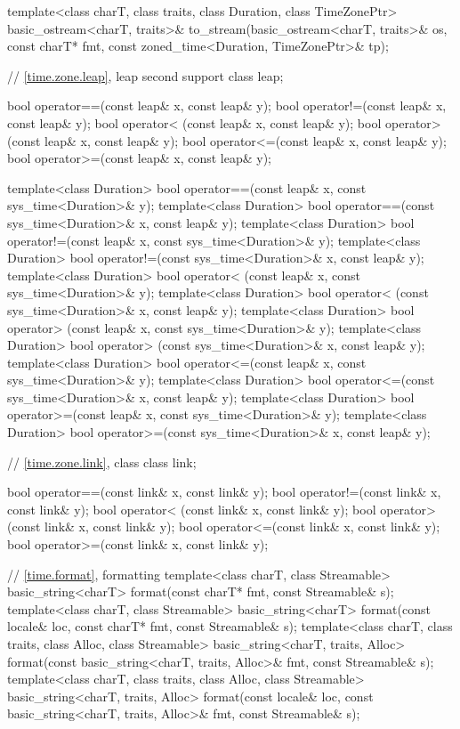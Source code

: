 \begin{codeblock}
{{    template<class charT, class traits, class Duration, class TimeZonePtr>
      basic_ostream<charT, traits>&
        to_stream(basic_ostream<charT, traits>& os, const charT* fmt,
                  const zoned_time<Duration, TimeZonePtr>& tp);

    // \ref{time.zone.leap}, leap second support
    class leap;

    bool operator==(const leap& x, const leap& y);
    bool operator!=(const leap& x, const leap& y);
    bool operator< (const leap& x, const leap& y);
    bool operator> (const leap& x, const leap& y);
    bool operator<=(const leap& x, const leap& y);
    bool operator>=(const leap& x, const leap& y);

    template<class Duration>
      bool operator==(const leap& x, const sys_time<Duration>& y);
    template<class Duration>
      bool operator==(const sys_time<Duration>& x, const leap& y);
    template<class Duration>
      bool operator!=(const leap& x, const sys_time<Duration>& y);
    template<class Duration>
      bool operator!=(const sys_time<Duration>& x, const leap& y);
    template<class Duration>
      bool operator< (const leap& x, const sys_time<Duration>& y);
    template<class Duration>
      bool operator< (const sys_time<Duration>& x, const leap& y);
    template<class Duration>
      bool operator> (const leap& x, const sys_time<Duration>& y);
    template<class Duration>
      bool operator> (const sys_time<Duration>& x, const leap& y);
    template<class Duration>
      bool operator<=(const leap& x, const sys_time<Duration>& y);
    template<class Duration>
      bool operator<=(const sys_time<Duration>& x, const leap& y);
    template<class Duration>
      bool operator>=(const leap& x, const sys_time<Duration>& y);
    template<class Duration>
      bool operator>=(const sys_time<Duration>& x, const leap& y);

    // \ref{time.zone.link}, class 
    class link;

    bool operator==(const link& x, const link& y);
    bool operator!=(const link& x, const link& y);
    bool operator< (const link& x, const link& y);
    bool operator> (const link& x, const link& y);
    bool operator<=(const link& x, const link& y);
    bool operator>=(const link& x, const link& y);

    // \ref{time.format}, formatting
    template<class charT, class Streamable>
      basic_string<charT>
        format(const charT* fmt, const Streamable& s);
    template<class charT, class Streamable>
      basic_string<charT>
        format(const locale& loc, const charT* fmt, const Streamable& s);
    template<class charT, class traits, class Alloc, class Streamable>
      basic_string<charT, traits, Alloc>
        format(const basic_string<charT, traits, Alloc>& fmt, const Streamable& s);
    template<class charT, class traits, class Alloc, class Streamable>
      basic_string<charT, traits, Alloc>
        format(const locale& loc, const basic_string<charT, traits, Alloc>& fmt,
               const Streamable& s);

}}
\end{codeblock}
